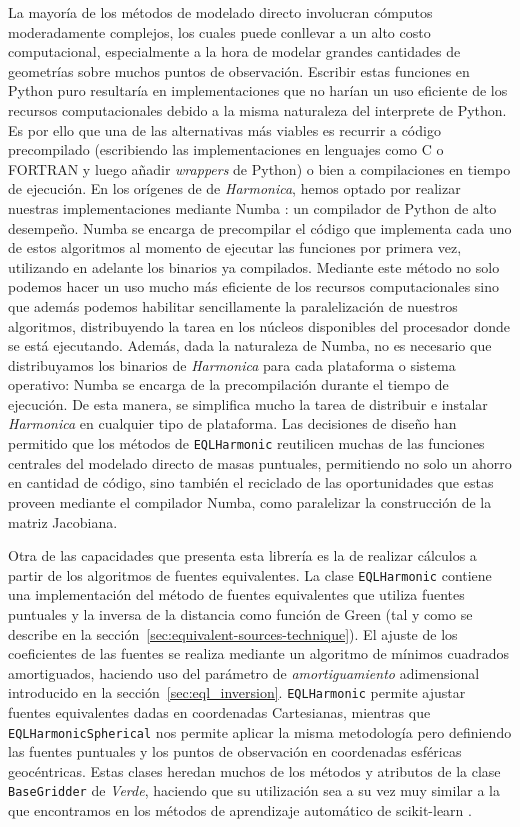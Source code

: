 La mayoría de los métodos de modelado directo involucran cómputos moderadamente
complejos, los cuales puede conllevar a un alto costo computacional,
especialmente a la hora de modelar grandes cantidades de geometrías sobre
muchos puntos de observación.
Escribir estas funciones en Python puro resultaría en implementaciones que no
harían un uso eficiente de los recursos computacionales debido a la misma
naturaleza del interprete de Python.
Es por ello que una de las alternativas más viables es recurrir a código
precompilado (escribiendo las implementaciones en lenguajes como C o FORTRAN
y luego añadir \emph{wrappers} de Python) o bien a compilaciones en tiempo de
ejecución.
En los orígenes de de \emph{Harmonica}, hemos optado por realizar nuestras
implementaciones mediante Numba \citep{numba2015}: un compilador de Python de
alto desempeño.
Numba se encarga de precompilar el código que implementa cada uno de estos
algoritmos al momento de ejecutar las funciones por primera vez, utilizando en
adelante los binarios ya compilados.
Mediante este método no solo podemos hacer un uso mucho más eficiente de los
recursos computacionales sino que además podemos habilitar sencillamente la
paralelización de nuestros algoritmos, distribuyendo la tarea en los
núcleos disponibles del procesador donde se está ejecutando.
Además, dada la naturaleza de Numba, no es necesario que distribuyamos los
binarios de \emph{Harmonica} para cada plataforma o sistema operativo: Numba se
encarga de la precompilación durante el tiempo de ejecución.
De esta manera, se simplifica mucho la tarea de distribuir e instalar
\emph{Harmonica} en cualquier tipo de plataforma.
Las decisiones de diseño han permitido que los métodos de \texttt{EQLHarmonic}
reutilicen muchas de las funciones centrales del modelado directo de masas
puntuales, permitiendo no solo un ahorro en cantidad de código, sino también el
reciclado de las oportunidades que estas proveen mediante el compilador Numba,
como paralelizar la construcción de la matriz Jacobiana.

Otra de las capacidades que presenta esta librería es la de realizar cálculos
a partir de los algoritmos de fuentes equivalentes.
La clase \texttt{EQLHarmonic} contiene una implementación del método de fuentes
equivalentes que utiliza fuentes puntuales y la inversa de la distancia como
función de Green (tal y como se describe en la
sección~\ref{sec:equivalent-sources-technique}).
El ajuste de los coeficientes de las fuentes se realiza mediante un algoritmo
de mínimos cuadrados amortiguados, haciendo uso del parámetro de
\emph{amortiguamiento} adimensional introducido en la
sección~\ref{sec:eql_inversion}.
\texttt{EQLHarmonic} permite ajustar fuentes equivalentes dadas en coordenadas
Cartesianas, mientras que \texttt{EQLHarmonicSpherical} nos permite aplicar la
misma metodología pero definiendo las fuentes puntuales y los puntos de
observación en coordenadas esféricas geocéntricas.
Estas clases heredan muchos de los métodos y atributos de la clase
\texttt{BaseGridder} de \emph{Verde}, haciendo que su utilización sea a su vez
muy similar a la que encontramos en los métodos de aprendizaje automático de
scikit-learn \citep{sklearn2011}.

